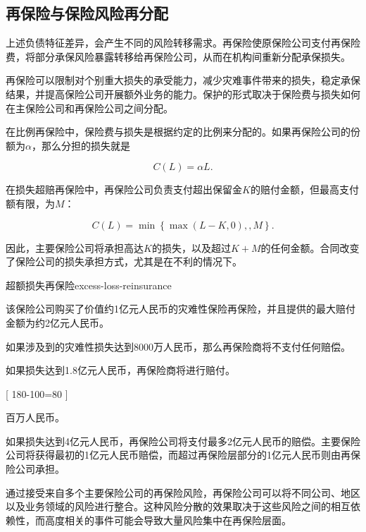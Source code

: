 \subsection{再保险与保险风险再分配}


上述负债特征差异，会产生不同的风险转移需求。再保险使原保险公司支付再保险费，将部分承保风险暴露转移给再保险公司，从而在机构间重新分配承保损失。


再保险可以限制对个别重大损失的承受能力，减少灾难事件带来的损失，稳定承保结果，并提高保险公司开展额外业务的能力。保护的形式取决于保险费与损失如何在主保险公司和再保险公司之间分配。

在比例再保险中，保险费与损失是根据约定的比例来分配的。如果再保险公司的份额为$\alpha$，那么分担的损失就是

\begin{equation}
C(L)=\alpha L.
\label{eq:ch15-proportional-reinsurance-payoff}
\end{equation}

在损失超赔再保险中，再保险公司负责支付超出保留金$K$的赔付金额，但最高支付额有限，为$M$：

\begin{equation}
C(L)=\min\left\{\max(L-K,0),,M\right\}.
\label{eq:ch15-excess-of-loss}
\end{equation}

因此，主要保险公司将承担高达$K$的损失，以及超过$K+M$的任何金额。合同改变了保险公司的损失承担方式，尤其是在不利的情况下。

\begin{example}{超额损失再保险}{excess-loss-reinsurance}

该保险公司购买了价值约1亿元人民币的灾难性保险再保险，并且提供的最大赔付金额为约2亿元人民币。

如果涉及到的灾难性损失达到8000万人民币，那么再保险商将不支付任何赔偿。

如果损失达到1.8亿元人民币，再保险商将进行赔付。

[
180-100=80
]

百万人民币。

如果损失达到4亿元人民币，再保险公司将支付最多2亿元人民币的赔偿。主要保险公司将获得最初的1亿元人民币赔偿，而超过再保险层部分的1亿元人民币则由再保险公司承担。

\end{example}

通过接受来自多个主要保险公司的再保险风险，再保险公司可以将不同公司、地区以及业务领域的风险进行整合。这种风险分散的效果取决于这些风险之间的相互依赖性，而高度相关的事件可能会导致大量风险集中在再保险层面。

